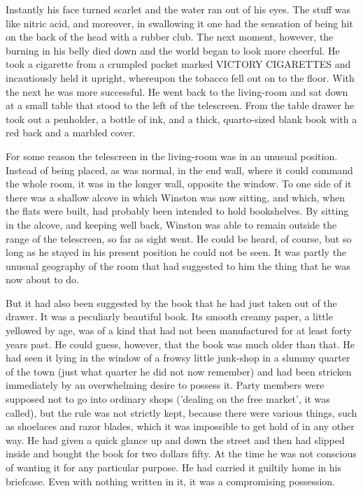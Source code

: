 \documentclass{article}
\begin{document}
Instantly his face turned scarlet and the water ran out of his eyes. The
stuff was like nitric acid, and moreover, in swallowing it one had the
sensation of being hit on the back of the head with a rubber club. The
next moment, however, the burning in his belly died down and the world
began to look more cheerful. He took a cigarette from a crumpled packet
marked VICTORY CIGARETTES and incautiously held it upright, whereupon the
tobacco fell out on to the floor. With the next he was more successful.
He went back to the living-room and sat down at a small table that stood
to the left of the telescreen. From the table drawer he took out a
penholder, a bottle of ink, and a thick, quarto-sized blank book with a
red back and a marbled cover.

For some reason the telescreen in the living-room was in an unusual
position. Instead of being placed, as was normal, in the end wall, where
it could command the whole room, it was in the longer wall, opposite the
window. To one side of it there was a shallow alcove in which Winston
was now sitting, and which, when the flats were built, had probably been
intended to hold bookshelves. By sitting in the alcove, and keeping well
back, Winston was able to remain outside the range of the telescreen, so
far as sight went. He could be heard, of course, but so long as he stayed
in his present position he could not be seen. It was partly the unusual
geography of the room that had suggested to him the thing that he was now
about to do.

But it had also been suggested by the book that he had just taken out of
the drawer. It was a peculiarly beautiful book. Its smooth creamy paper,
a little yellowed by age, was of a kind that had not been manufactured for
at least forty years past. He could guess, however, that the book was much
older than that. He had seen it lying in the window of a frowsy little
junk-shop in a slummy quarter of the town (just what quarter he did not
now remember) and had been stricken immediately by an overwhelming desire
to possess it. Party members were supposed not to go into ordinary shops
('dealing on the free market', it was called), but the rule was not
strictly kept, because there were various things, such as shoelaces and
razor blades, which it was impossible to get hold of in any other way. He
had given a quick glance up and down the street and then had slipped inside
and bought the book for two dollars fifty. At the time he was not conscious
of wanting it for any particular purpose. He had carried it guiltily home
in his briefcase. Even with nothing written in it, it was a compromising
possession.
\end{document}
